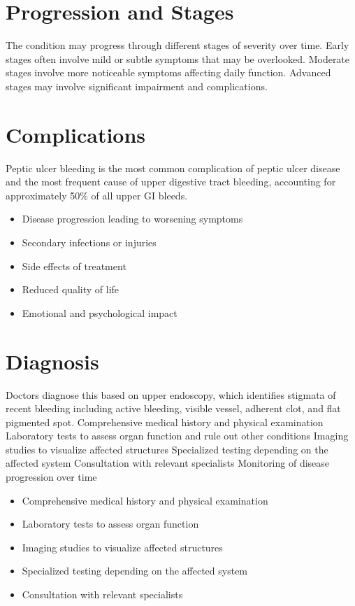 \section{Progression and Stages}
The condition may progress through different stages of severity over time. Early stages often involve mild or subtle symptoms that may be overlooked. Moderate stages involve more noticeable symptoms affecting daily function. Advanced stages may involve significant impairment and complications.
\section{Complications}
Peptic ulcer bleeding is the most common complication of peptic ulcer disease and the most frequent cause of upper digestive tract bleeding, accounting for approximately 50\% of all upper GI bleeds.

\begin{itemize}[noitemsep]
  \item Disease progression leading to worsening symptoms
  \item Secondary infections or injuries
  \item Side effects of treatment
  \item Reduced quality of life
  \item Emotional and psychological impact
\end{itemize}
\section{Diagnosis}
Doctors diagnose this based on upper endoscopy, which identifies stigmata of recent bleeding including active bleeding, visible vessel, adherent clot, and flat pigmented spot. Comprehensive medical history and physical examination Laboratory tests to assess organ function and rule out other conditions Imaging studies to visualize affected structures Specialized testing depending on the affected system Consultation with relevant specialists Monitoring of disease progression over time

\begin{itemize}[noitemsep]
  \item Comprehensive medical history and physical examination
  \item Laboratory tests to assess organ function
  \item Imaging studies to visualize affected structures
  \item Specialized testing depending on the affected system
  \item Consultation with relevant specialists
\end{itemize}
